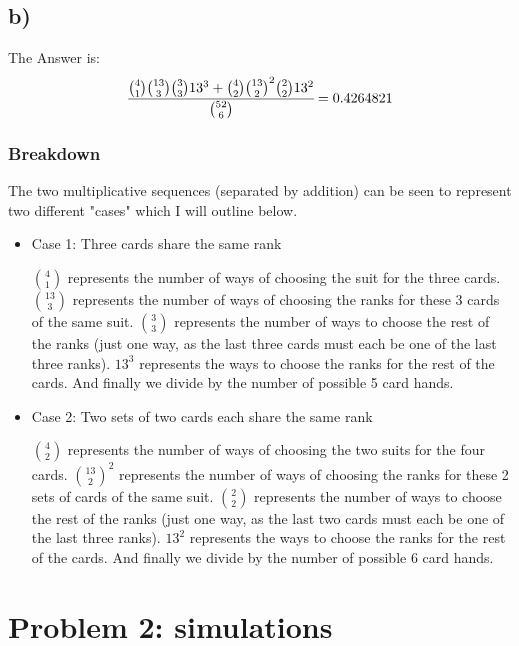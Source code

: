 \documentclass[11pt]{article}
\begin{document}
\subsection*{b)}
\label{sec:orgbcccff4}


The Answer is: 
\begin{equation}
\cfrac{{{4}\choose{1}} {{13}\choose{3}} {{3}\choose{3}} 13^3 + {{4}\choose{2}} {{13}\choose{2}}^{2} {{2}\choose{2}} 13^{2}} {{{52}\choose{6}}} = 0.4264821
\end{equation}

\subsubsection*{Breakdown}
\label{sec:orgda1da68}

The two multiplicative sequences (separated by addition) can be seen to represent two different "cases" which I will outline below.

\begin{itemize}
\item Case 1: Three cards share the same rank
\label{sec:org07b351d}

\({4}\choose{1}\) represents the number of ways of choosing the suit for the three cards. \({{13}\choose{3}}\) represents the number of ways of choosing the ranks for these 3 cards of the same suit. \({{3}\choose{3}}\) represents the number of ways to choose the rest of the ranks (just one way, as the last three cards must each be one of the last three ranks). \(13^{3}\) represents the ways to choose the ranks for the rest of the cards. And finally we divide by the number of possible 5 card hands.

\item Case 2: Two sets of two cards each share the same rank
\label{sec:org745c3c3}

\({4}\choose{2}\) represents the number of ways of choosing the two suits for the four cards. \({{13}\choose{2}}^{2}\) represents the number of ways of choosing the ranks for these 2 sets of cards of the same suit. \({{2}\choose{2}}\) represents the number of ways to choose the rest of the ranks (just one way, as the last two cards must each be one of the last three ranks). \(13^{2}\) represents the ways to choose the ranks for the rest of the cards. And finally we divide by the number of possible 6 card hands.
\end{itemize}

\section*{Problem 2: simulations}
\label{sec:orgc2c6337}
\end{document}
